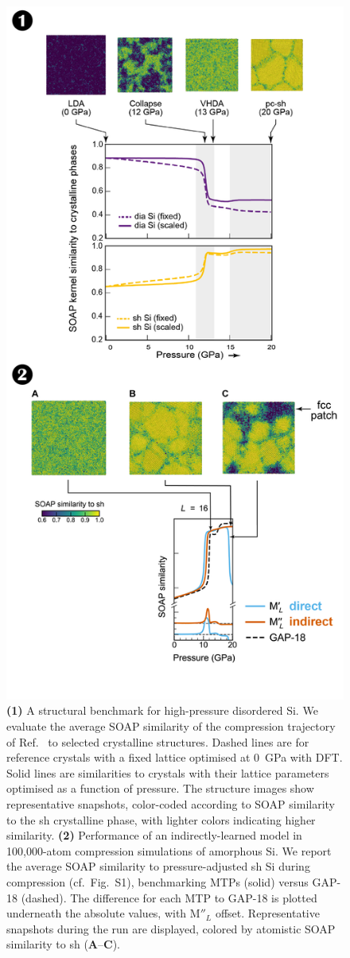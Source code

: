 \documentclass[12pt,a4paper,twoside,nobind]{ociamthesis}
\newcommand{\ind}[1]{\mathrm{#1''\!\!}}
\newcommand{\direct}[1]{\mathrm{#1'\!}}
\begin{document}
\begin{figure}[!ht]
  \centering
  \includegraphics[width=0.55\linewidth]{simplified_compression_series.png}
  \caption{
    \textbf{(1)} A structural benchmark for high-pressure disordered Si.
    We evaluate the average SOAP similarity of the compression trajectory of Ref.\ \cite{Deringer2021} to selected crystalline structures.
    Dashed lines are for reference crystals with a fixed lattice optimised at \SI{0}{GPa} with DFT. 
    Solid lines are similarities to crystals with their lattice parameters optimised as a function of pressure. 
    The structure images show representative snapshots, color-coded according to SOAP similarity to the sh crystalline phase,
    with lighter colors indicating higher similarity.
  \textbf{(2)}%
    Performance of an indirectly-learned model in 100,000-atom compression simulations of amorphous Si.
  We report the average SOAP similarity to pressure-adjusted sh Si during compression (cf.\ Fig.\ S1), benchmarking MTPs (solid) versus GAP-18 (dashed).
  The difference for each MTP to GAP-18 is plotted underneath the absolute values, with $\ind{M}_{L}$ offset.
  Representative snapshots during the run are displayed, colored by atomistic SOAP similarity to sh (\textbf{A}--\textbf{C}). 
  }
  \label{fig:SOAP_difference}
\end{figure}
\end{document}
